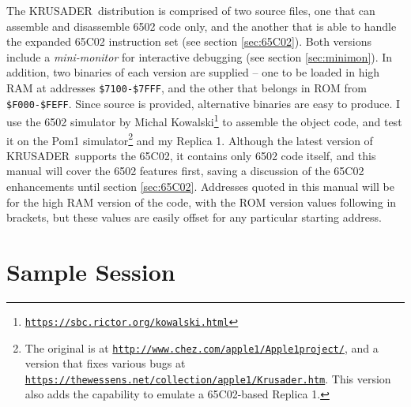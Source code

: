\documentclass[12pt]{article}
\newcommand{\krusader}{\textsf{KRUSADER}}
\renewcommand{\url}[1]{\href{#1}{\texttt{#1}}}
\begin{document}
The \krusader\ distribution is comprised of two source files, one that can assemble and disassemble 6502 code only, and the another
that is able to handle the expanded 65C02 instruction set (see section \ref{sec:65C02}).
Both versions include a \emph{mini-monitor} for interactive debugging (see section \ref{sec:minimon}).
In addition, two binaries of each version are supplied -- one to be loaded in high RAM at addresses \texttt{\$7100-\$7FFF}, and the other that belongs in ROM from \texttt{\$F000-\$FEFF}.  Since source is provided, alternative binaries are easy to produce.  I use the 6502 simulator by Michal Kowalski\footnote{\url{https://sbc.rictor.org/kowalski.html}} to assemble the object code, and test it on the Pom1 simulator\footnote{The original is at \url{http://www.chez.com/apple1/Apple1project/}, and a version that fixes various bugs at \url{https://thewessens.net/collection/apple1/Krusader.htm}. This version also adds the capability to emulate a 65C02-based Replica 1.} and my Replica 1.  Although the latest version of \krusader\ supports the 65C02, it contains only 6502 code itself, and this manual will cover the 6502 features first, saving a discussion of the 65C02 enhancements until section \ref{sec:65C02}.  Addresses quoted in this manual will be for the high RAM version of the code, with the ROM version values following in brackets, but these values are easily offset for any particular starting address.

\section{Sample Session}
\label{sec:samplesession}
\end{document}
